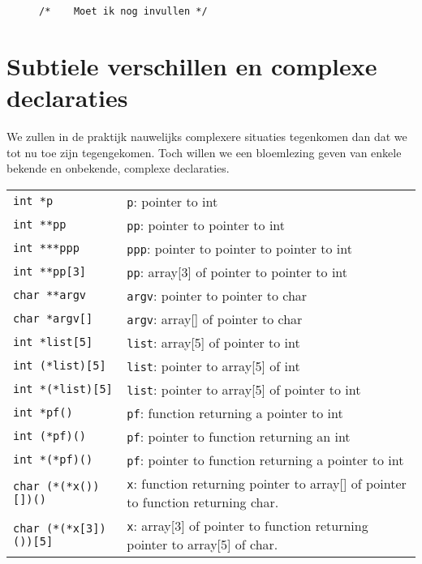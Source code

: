 \begin{figure}[!ht]
\begin{lstlisting}[caption=Het gebruik van pointers op een ATmega-microcontroller.]
/*    Moet ik nog invullen */

\end{lstlisting}
\end{figure}

\section{Subtiele verschillen en complexe declaraties}
We zullen in de praktijk nauwelijks complexere situaties tegenkomen dan dat we tot nu toe zijn tegengekomen. Toch willen we een bloemlezing geven van enkele bekende en onbekende, complexe declaraties.

\begin{table}[!ht]
\begin{tabular}{lp{11cm}}
\lstinline|int *p| & \texttt{p}: pointer to int\\
\lstinline|int **pp| & \texttt{pp}: pointer to pointer to int \\
\lstinline|int ***ppp| & \texttt{ppp}: pointer to pointer to pointer to int \\
\lstinline|int **pp[3]| & \texttt{pp}: array[3] of pointer to pointer to int \\
\lstinline|char **argv| & \texttt{argv}: pointer to pointer to char \\
\lstinline|char *argv[]| &\texttt{argv}: array[] of pointer to char \\
\lstinline|int *list[5]| & \texttt{list}: array[5] of pointer to int \\
\lstinline|int (*list)[5]| & \texttt{list}: pointer to array[5] of int \\
\lstinline|int *(*list)[5]| & \texttt{list}: pointer to array[5] of pointer to int \\
\lstinline|int *pf()| & \texttt{pf}: function returning a pointer to int \\
\lstinline|int (*pf)()| & \texttt{pf}: pointer to function returning an int \\
\lstinline|int *(*pf)()| & \texttt{pf}: pointer to function returning a pointer to int \\
\lstinline|char (*(*x())[])()| & \texttt{x}: function returning pointer to array[] of pointer to function returning char.\\
\lstinline|char (*(*x[3])())[5]| & \texttt{x}: array[3] of pointer to function returning pointer to array[5] of char.\\
\end{tabular}
\end{table}
